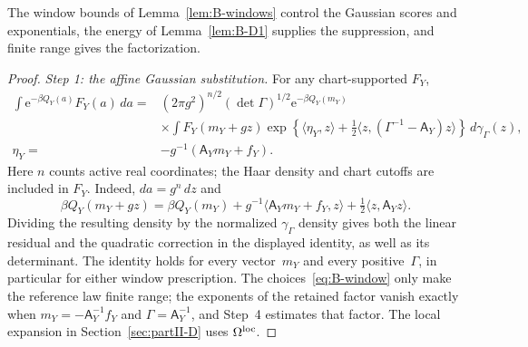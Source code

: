 The window bounds of Lemma~\ref{lem:B-windows} control the Gaussian scores and exponentials, the energy of Lemma~\ref{lem:B-D1} supplies the suppression, and finite range gives the factorization.
\begin{proof}
\emph{Step 1: the affine Gaussian substitution.} For any chart-supported $F_Y$,
\begin{align*}
\int \mathrm e^{-\beta Q_Y(a)}F_Y(a)\,da
={}&(2\pi g^2)^{n/2}(\det\Gamma)^{1/2}\mathrm e^{-\beta Q_Y(m_Y)}\\
&\times\int F_Y(m_Y+gz)
 \exp\left\{\langle\eta_Y,z\rangle+\tfrac12\langle z,(\Gamma^{-1}-\mathsf A_Y)z\rangle\right\}\,d\gamma_\Gamma(z),\\
\eta_Y={}&-g^{-1}(\mathsf A_Ym_Y+f_Y).
\end{align*}
Here $n$ counts active real coordinates; the Haar density and chart cutoffs are included in $F_Y$. Indeed, $da=g^n\,dz$ and
\begin{equation*}
\beta Q_Y(m_Y+gz)=\beta Q_Y(m_Y)
 +g^{-1}\langle\mathsf A_Ym_Y+f_Y,z\rangle
 +\tfrac12\langle z,\mathsf A_Yz\rangle.
\end{equation*}
Dividing the resulting density by the normalized $\gamma_\Gamma$ density gives both the linear residual and the quadratic correction in the displayed identity, as well as its determinant. The identity holds for every vector~$m_Y$ and every positive~$\Gamma$, in particular for either window prescription. The choices~\eqref{eq:B-window} only make the reference law finite range; the exponents of the retained factor vanish exactly when $m_Y=-\mathsf A_Y^{-1}f_Y$ and $\Gamma=\mathsf A_Y^{-1}$, and Step~4 estimates that factor. The local expansion in Section~\ref{sec:partII-D} uses $\Omega^{\rm loc}$.


\end{proof}

